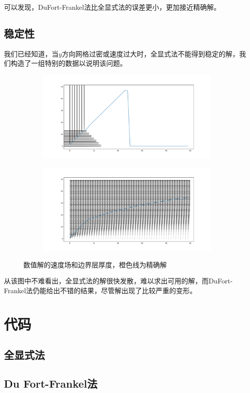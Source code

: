 \documentclass[12pt]{ctexart}
\begin{document}
可以发现，DuFort-Frankel法比全显式法的误差更小，更加接近精确解。

\subsection{稳定性}

我们已经知道，当$y$方向网格过密或速度过大时，全显式法不能得到稳定的解，我们构造了一组特别的数据以说明该问题。
\begin{figure}[ht]
    \centering
    \begin{subfigure}{0.4\textwidth}
        \includegraphics[width=\textwidth]{figure/explict_unstable.pdf}
    \end{subfigure}
    \begin{subfigure}{0.4\textwidth}
        \includegraphics[width=\textwidth]{figure/dufort_stable.pdf}
    \end{subfigure}
    \caption{数值解的速度场和边界层厚度，橙色线为精确解}
\end{figure}
从该图中不难看出，全显式法的解很快发散，难以求出可用的解，而DuFort-Frankel法仍能给出不错的结果，尽管解出现了比较严重的变形。

\clearpage
\appendix
\section{代码}

\subsection{全显式法}


\subsection{Du Fort-Frankel法}


\clearpage
\printbibliography
\end{document}
